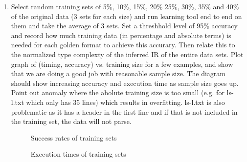 \begin{enumerate}
\item Select random training sets of 5\%, 10\%, 15\%, 20\% 25\%, 30\%, 35\% and 40\% of 
the original data (3 sets for each size) and run learning tool end to end on 
them and take the average of 3 sets. 
Set a threshhold level of 95\% accuracy and record how much training data (in percentage and
absolute terms) is needed for each golden format to achieve this accurary. Then relate this
to the normalized type complexty of the inferred IR of the entire data sets.
Plot graph of (timing, accuracy) vs. training size 
for a few examples, and show that we are doing a good job with reasonable sample size. The diagram should
show increasing accuracy and execution time as sample size goes up. Point out anomaly
where the abolute training size is too small (e.g. for ls-l.txt which only has 35 lines) which results
in overfitting. ls-l.txt is also problematic as it has a header in the first line and if that is not included
in the training set, the data will not parse.

\begin{figure}
\caption{Success rates of training sets}
\end{figure}

\begin{figure}
\caption{Execution times of training sets}
\end{figure}
\end{enumerate}

